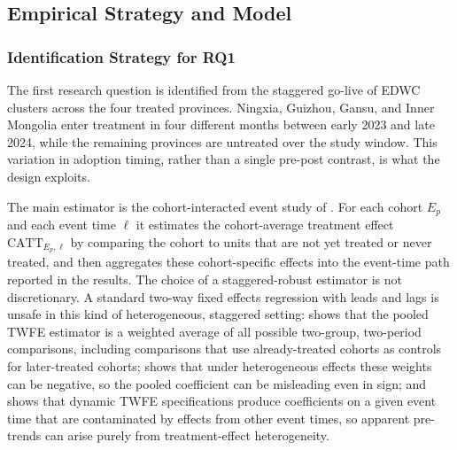 \documentclass[12pt,a4paper]{article}
\begin{document}
\subsection{Empirical Strategy and Model}
%

\subsubsection{Identification Strategy for RQ1}
%

The first research question is identified from the staggered go-live
of EDWC clusters across the four treated provinces. Ningxia, Guizhou,
Gansu, and Inner Mongolia enter treatment in four different months
between early 2023 and late 2024, while the remaining provinces are
untreated over the study window. This variation in adoption timing,
rather than a single pre-post contrast, is what the design exploits.

The main estimator is the cohort-interacted event study of
\citet{sunabraham-2021-estimatingdynamictreatmenta}. For each cohort
$E_p$ and each event time $\ell$ it estimates the cohort-average
treatment effect $\text{CATT}_{E_p, \ell}$ by comparing the cohort to
units that are not yet treated or never treated, and then aggregates
these cohort-specific effects into the event-time path reported in
the results. The choice of a staggered-robust estimator is not
discretionary. A standard two-way fixed effects regression with leads
and lags is unsafe in this kind of heterogeneous, staggered setting:
\citet{goodman-bacon-2021-differenceindifferencesvariationtreatmenta}
shows that the pooled TWFE estimator is a weighted average of all
possible two-group, two-period comparisons, including comparisons
that use already-treated cohorts as controls for later-treated
cohorts; \citet{dechaisemartindhaultfoeuille-2020-twowayfixedeffects}
shows that under heterogeneous effects these weights can be negative,
so the pooled coefficient can be misleading even in sign; and
\citet{sunabraham-2021-estimatingdynamictreatmenta} shows that
dynamic TWFE specifications produce coefficients on a given event
time that are contaminated by effects from other event times, so
apparent pre-trends can arise purely from treatment-effect
heterogeneity.
\end{document}
